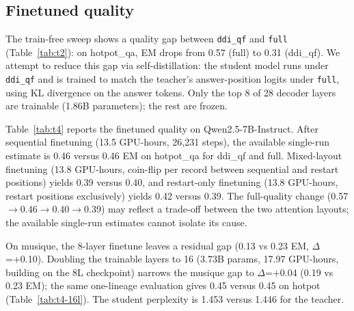 \begin{table}[t]
\centering\small
\caption{T8 --- V54 separated transfer estimands on the natural-QA primary
metrics. $C$ is the retained historical normalized remaining tuned gap;
$\Delta$ columns are paired base-to-tuned changes.}
\label{tab:t8-transfer-estimands}

\end{table}

\begin{table}[t]
\centering
\caption{T2 --- mask $\times$ model quality, train-free. Each displayed cell
    is a single-run estimate from the cited artifact; it has no comparison
    confidence interval. The separate Qwen full-baseline seed summaries and
    their descriptive intervals appear in Table~\ref{tab:t6-delta}.}
\label{tab:t2}
\end{table}

\subsection{Finetuned quality}
\label{sec:results-quality-finetune}

The train-free sweep shows a quality gap between \texttt{ddi\_qf} and
\texttt{full} (Table~\ref{tab:t2}): on hotpot\_qa, EM drops from 0.57
(full) to 0.31 (ddi\_qf). We attempt to reduce this gap via self-distillation: the
student model runs under \texttt{ddi\_qf} and is trained to match the
teacher's answer-position logits under \texttt{full}, using KL divergence
on the answer tokens. Only the top 8 of 28 decoder layers are trainable
(1.86B parameters); the rest are frozen.

Table~\ref{tab:t4} reports the finetuned quality on Qwen2.5-7B-Instruct.
After sequential finetuning (13.5 GPU-hours, 26{,}231 steps), the available
single-run estimate is 0.46 versus 0.46 EM on hotpot\_qa for ddi\_qf and
full. Mixed-layout finetuning (13.8 GPU-hours, coin-flip per record between
sequential and restart positions) yields 0.39 versus 0.40, and restart-only
finetuning (13.8 GPU-hours, restart positions exclusively) yields 0.42 versus
0.39. The full-quality change
(0.57$\to$0.46$\to$0.40$\to$0.39) may reflect a trade-off between the two
attention layouts; the available single-run estimates cannot isolate its cause.

On musique, the 8-layer finetune leaves a residual gap (0.13 vs 0.23 EM,
$\Delta$=+0.10). Doubling the trainable layers to 16 (3.73B params,
17.97 GPU-hours, building on the 8L checkpoint) narrows the musique gap
to $\Delta$=+0.04 (0.19 vs 0.23 EM); the same one-lineage evaluation gives
0.45 versus 0.45 on hotpot (Table~\ref{tab:t4-16l}). The student perplexity
is 1.453 versus 1.446 for the teacher.

